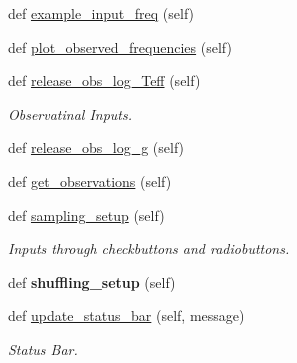 \begin{DoxyCompactItemize}
def \hyperlink{classasamba_1_1frontend__orig_1_1_g_u_i_a6bb5f142abc9b56ccc0d7f9f7b3b99f1}{example\+\_\+input\+\_\+freq} (self)
\item 
def \hyperlink{classasamba_1_1frontend__orig_1_1_g_u_i_abb9e1670526f7bf28a6f2317e14546c0}{plot\+\_\+observed\+\_\+frequencies} (self)
\item 
def \hyperlink{classasamba_1_1frontend__orig_1_1_g_u_i_a5b038a5cef0239f96abd6accd44df396}{release\+\_\+obs\+\_\+log\+\_\+\+Teff} (self)
\begin{DoxyCompactList}\small\item\em Observatinal Inputs. \end{DoxyCompactList}\item 
def \hyperlink{classasamba_1_1frontend__orig_1_1_g_u_i_a23fecf5b0f52f4b0c420118e8572c435}{release\+\_\+obs\+\_\+log\+\_\+g} (self)
\item 
def \hyperlink{classasamba_1_1frontend__orig_1_1_g_u_i_a2115a025361cf5282c72baef51ec0004}{get\+\_\+observations} (self)
\item 
\mbox{\label{classasamba_1_1frontend__orig_1_1_g_u_i_acd2f0daae2ef040bed9c496df0063cf6}} 
def \hyperlink{classasamba_1_1frontend__orig_1_1_g_u_i_acd2f0daae2ef040bed9c496df0063cf6}{sampling\+\_\+setup} (self)
\begin{DoxyCompactList}\small\item\em Inputs through checkbuttons and radiobuttons. \end{DoxyCompactList}\item 
\mbox{\label{classasamba_1_1frontend__orig_1_1_g_u_i_a0c1d59a9980bfd581ba746733429d620}} 
def {\bfseries shuffling\+\_\+setup} (self)
\item 
def \hyperlink{classasamba_1_1frontend__orig_1_1_g_u_i_a630301b7e934776f232fcb4562974ae9}{update\+\_\+status\+\_\+bar} (self, message)
\begin{DoxyCompactList}\small\item\em Status Bar. \end{DoxyCompactList}\end{DoxyCompactItemize}

